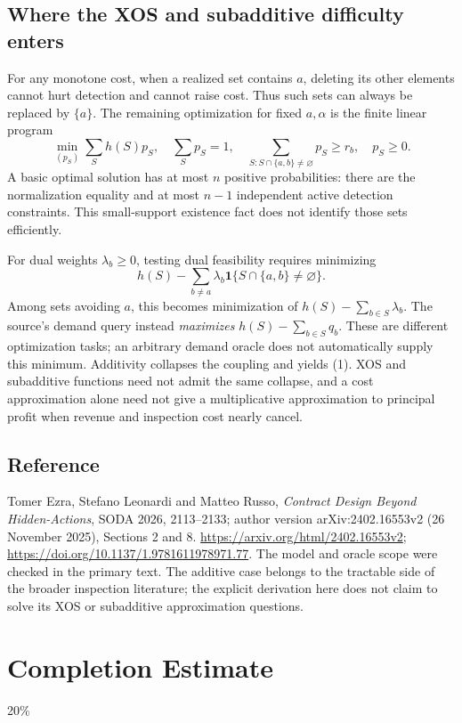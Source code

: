 \documentclass[11pt,a4paper]{article}
\newcommand{\ind}{\mathbf 1}
\begin{document}
\subsection*{Where the XOS and subadditive difficulty enters}
For any monotone cost, when a realized set contains $a$, deleting its other elements cannot hurt detection and cannot raise cost. Thus such sets can always be replaced by $\{a\}$. The remaining optimization for fixed $a,\alpha$ is the finite linear program
\[
 \min_{(p_S)}\sum_Sh(S)p_S,\quad
 \sum_Sp_S=1,\quad
 \sum_{S:S\cap\{a,b\}\ne\varnothing}p_S\geq r_b,\quad p_S\geq0.
\]
A basic optimal solution has at most $n$ positive probabilities: there are the normalization equality and at most $n-1$ independent active detection constraints. This small-support existence fact does not identify those sets efficiently.

For dual weights $\lambda_b\geq0$, testing dual feasibility requires minimizing
\[
 h(S)-\sum_{b\ne a}\lambda_b\ind\{S\cap\{a,b\}\ne\varnothing\}.
\]
Among sets avoiding $a$, this becomes minimization of $h(S)-\sum_{b\in S}\lambda_b$. The source's demand query instead \emph{maximizes} $h(S)-\sum_{b\in S}q_b$. These are different optimization tasks; an arbitrary demand oracle does not automatically supply this minimum. Additivity collapses the coupling and yields (1). XOS and subadditive functions need not admit the same collapse, and a cost approximation alone need not give a multiplicative approximation to principal profit when revenue and inspection cost nearly cancel.

\subsection*{Reference}
Tomer Ezra, Stefano Leonardi and Matteo Russo, \emph{Contract Design Beyond Hidden-Actions}, SODA 2026, 2113--2133; author version arXiv:2402.16553v2 (26 November 2025), Sections 2 and 8. \url{https://arxiv.org/html/2402.16553v2}; \url{https://doi.org/10.1137/1.9781611978971.77}. The model and oracle scope were checked in the primary text. The additive case belongs to the tractable side of the broader inspection literature; the explicit derivation here does not claim to solve its XOS or subadditive approximation questions.

\section{Completion Estimate}
20\%
\end{document}
